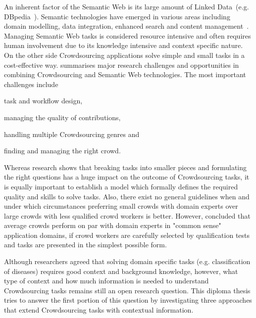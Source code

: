 An inherent factor of the Semantic Web is its large amount of Linked Data~(e.g. DBpedia~\cite{lehmann2015}). Semantic technologies have emerged in various areas including domain modelling, data integration, enhanced search and content management~\cite{semantic-web-usecases}. Managing Semantic Web tasks is considered resource intensive and often requires human involvement due to its knowledge intensive and context specific nature. On the other side Crowdsourcing applications solve simple and small tasks in a cost-effective way. \cite{sarasua2015crowdsourcing} summarises major research challenges and opportunities in combining Crowdsourcing and Semantic Web technologies. The most important challenges include 
\begin{inparaenum}[1)]
		\item task and workflow design,
		\item managing the quality of contributions,
		\item handling multiple Crowdsourcing genres and 
		\item finding and managing the right crowd.
\end{inparaenum}
Whereas research shows that breaking tasks into smaller pieces and formulating the right questions has a huge impact on the outcome of Crowdsourcing tasks, it is equally important to establish a model which formally defines the required quality and skills to solve tasks. Also, there exist no general guidelines when and under which circumstances preferring small crowds with domain experts over large crowds with less qualified crowd workers is better. However, \cite{mortensen2013} concluded that average crowds perform on par with domain experts in "common sense" application domains, if crowd workers are carefully selected by qualification tests and tasks are presented in the simplest possible form.

Although researchers agreed that solving domain specific tasks (e.g. classification of diseases) requires good context and background knowledge, however, what type of context and how much information is needed to understand Crowdsourcing tasks remains still an open research question.
This diploma thesis tries to answer the first portion of this question by investigating three approaches that extend Crowdsourcing tasks with contextual information. 
